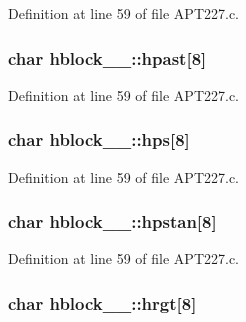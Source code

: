 Definition at line 59 of file A\+P\+T227.\+c.

\subsubsection[{\texorpdfstring{hpast}{hpast}}]{\setlength{\rightskip}{0pt plus 5cm}char hblock\+\_\+\_\+\+::hpast\mbox{[}8\mbox{]}}\hypertarget{structhblock__1___a10f1f2cc1e48d113009e1def46492d5c}{}\label{structhblock__1___a10f1f2cc1e48d113009e1def46492d5c}


Definition at line 59 of file A\+P\+T227.\+c.

\subsubsection[{\texorpdfstring{hps}{hps}}]{\setlength{\rightskip}{0pt plus 5cm}char hblock\+\_\+\_\+\+::hps\mbox{[}8\mbox{]}}\hypertarget{structhblock__1___ad5670a31767af89eee5b5ae6b4a86dc2}{}\label{structhblock__1___ad5670a31767af89eee5b5ae6b4a86dc2}


Definition at line 59 of file A\+P\+T227.\+c.

\subsubsection[{\texorpdfstring{hpstan}{hpstan}}]{\setlength{\rightskip}{0pt plus 5cm}char hblock\+\_\+\_\+\+::hpstan\mbox{[}8\mbox{]}}\hypertarget{structhblock__1___a75441239bebb0a3ef564a8aa4fed3c4a}{}\label{structhblock__1___a75441239bebb0a3ef564a8aa4fed3c4a}


Definition at line 59 of file A\+P\+T227.\+c.

\subsubsection[{\texorpdfstring{hrgt}{hrgt}}]{\setlength{\rightskip}{0pt plus 5cm}char hblock\+\_\+\_\+\+::hrgt\mbox{[}8\mbox{]}}\hypertarget{structhblock__1___a8462413668b7c2a4dc2ce2e1514fd865}{}\label{structhblock__1___a8462413668b7c2a4dc2ce2e1514fd865}


